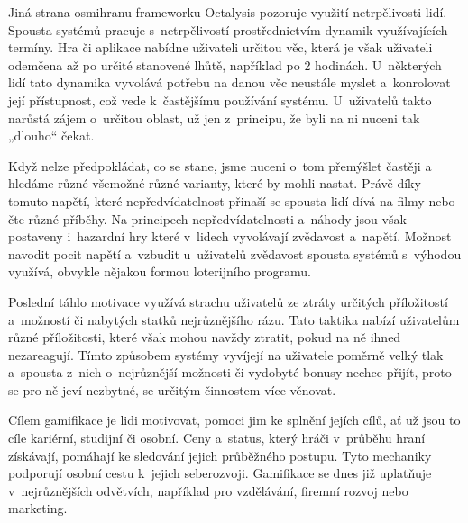 \documentclass[12pt]{article}
\begin{document}
Jiná strana osmihranu frameworku Octalysis pozoruje využití
netrpělivosti lidí. Spousta systémů pracuje s~netrpělivostí
prostřednictvím dynamik využívajících termíny. 
Hra či aplikace nabídne uživateli určitou věc, která je však uživateli 
odemčena až po určité stanovené lhůtě, například po 2 hodinách.
U~některých lidí tato dynamika vyvolává potřebu na danou věc neustále myslet
a~konrolovat její přístupnost, což vede k~častějšímu používání systému.
U~uživatelů takto narůstá zájem o~určitou oblast, už jen z~principu,
že byli na ni nuceni tak „dlouho“ čekat.

Když nelze předpokládat, co se stane, jsme nuceni o~tom přemýšlet častěji a~
hledáme různé všemožné různé varianty, které by mohli nastat.
Právě díky tomuto napětí, které nepředvídatelnost přinaší se spousta lidí 
dívá na filmy nebo čte různé příběhy. 
Na principech nepředvídatelnosti a~náhody jsou však postaveny i~hazardní hry
které v~lidech vyvolávají zvědavost a~napětí.
Možnost navodit pocit napětí a~vzbudit u~uživatelů zvědavost spousta systémů
s~výhodou využívá, obvykle nějakou formou loterijního programu.

Poslední táhlo motivace využívá strachu uživatelů ze ztráty určitých příložitostí 
a~možností či nabytých statků nejrůznějšího rázu. 
Tato taktika nabízí uživatelům různé příložitosti, které však mohou navždy ztratit,
pokud na ně ihned nezareagují. 
Tímto způsobem systémy vyvíjejí na uživatele poměrně velký tlak a~spousta z~nich o~nejrůznější možnosti či vydobyté bonusy nechce přijít,
proto se pro ně jeví nezbytné, se určitým činnostem více věnovat.


Cílem gamifikace je lidi motivovat, 
pomoci jim ke splnění jejích cílů, ať už jsou to cíle kariérní, studijní či osobní.
Ceny a~status, který hráči v~průběhu hraní získávají, pomáhají ke sledování jejich průběžného postupu. Tyto mechaniky podporují osobní cestu k~jejich seberozvoji. 
Gamifikace se dnes již uplatňuje v~nejrůznějších odvětvích, například pro vzdělávání, firemní rozvoj nebo marketing.



\end{document}
